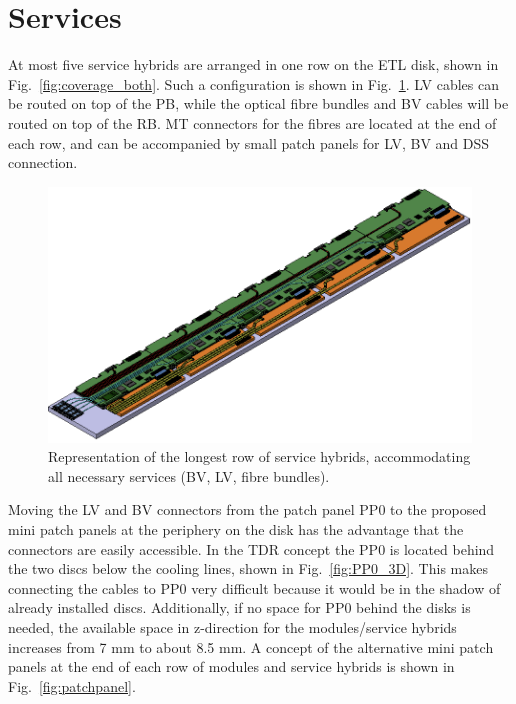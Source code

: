 \documentclass[11pt]{article}
\begin{document}
\section{Services}

At most five service hybrids are arranged in one row on the ETL disk, shown in Fig.~\ref{fig:coverage_both}.
Such a configuration is shown in Fig.~\ref{fig:services}.
LV cables can be routed on top of the PB, while the optical fibre bundles and BV cables will be routed on top of the RB.
MT connectors for the fibres are located at the end of each row, and can be accompanied by small patch panels for LV, BV and DSS connection.

\begin{figure}[!ht]
\centering
\includegraphics[width=0.90 \textwidth]{figures/services.png}
\caption{
Representation of the longest row of service hybrids, accommodating all necessary services (BV, LV, fibre bundles).
}
\label{fig:services}
\end{figure}

Moving the LV and BV connectors from the patch panel PP0 to the proposed mini patch panels at the periphery on the disk has the advantage that the connectors are easily accessible.
In the TDR concept the PP0 is located behind the two discs below the cooling lines, shown in Fig.~\ref{fig:PP0_3D}.
This makes connecting the cables to PP0 very difficult because it would be in the shadow of already installed discs.
Additionally, if no space for PP0 behind the disks is needed, the available space in z-direction for the modules/service hybrids increases from 7 mm to about 8.5 mm.
A concept of the alternative mini patch panels at the end of each row of modules and service hybrids is shown in Fig.~\ref{fig:patchpanel}.
\end{document}
